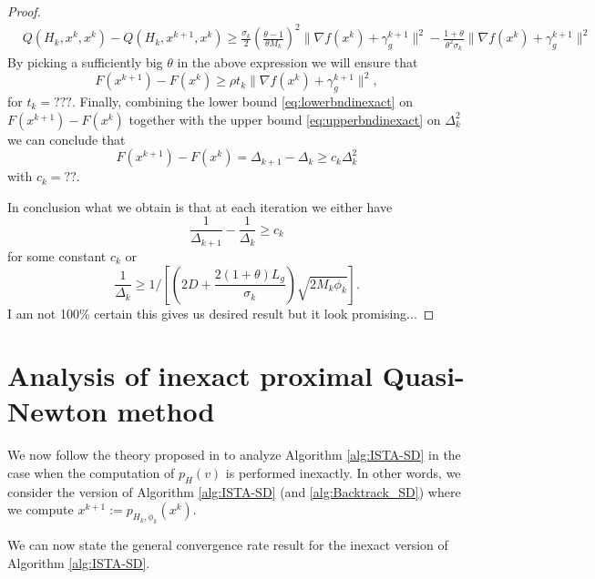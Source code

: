 \documentclass[11pt]{article}
\numberwithin{equation}{section}
\begin{document}
\begin{proof}
	       \begin{align}
	        &Q(H_k,x^k,x^k) - Q(H_k,x^{k+1}, x^k)\geq
	         \frac{\sigma_k}{2}(\frac{\theta-1}{\theta M_k})^2\| \nabla f(x^k) + \gamma_g^{k+1} \|^2- \frac{1+\theta}{\theta^2\sigma_k}\| \nabla f(x^k) + \gamma_g^{k+1} \|^2 \nonumber
	         \end{align}
	      By picking a sufficiently big $\theta$ in the above expression we will ensure that 
	 \[
	F(x^{k+1})-F(x^k)\geq \rho t_k \| \nabla f(x^k) + \gamma_g^{k+1} \|^2,
	\]   
	for $t_k=???$. 
	Finally, combining the lower bound \eqref{eq:lowerbndinexact} on $F(x^{k+1})-F(x^k)$ together with the upper bound \eqref {eq:upperbndinexact}
	on $\Delta_k^2$  we can conclude that
	\[
	F(x^{k+1})-F(x^k)=\Delta_{k+1}-\Delta_k\geq c_k\Delta_k^2
	\]
	with $c_k=??$. 

	In conclusion what we obtain is that at each iteration we either have 
	 \[
	\frac{1}{\Delta_{k+1}}-\frac{1}{\Delta_{k}}\geq c_k
	\]
	for some constant $c_k$ or
	 \[
	\frac{1}{\Delta_{k}}\geq  1/[(2D+  \frac{2(1+\theta)L_g}{\sigma_k})\sqrt{2M_k\phi_k}].
	\]
	I am not 100\% certain this gives us desired result but it look promising...	
\end{proof}

\section{Analysis of inexact proximal Quasi-Newton method} %
\label{sec:conv_inexact}

We now follow the theory proposed in  \cite{Schmidtetal} to analyze Algorithm \ref{alg:ISTA-SD}  in the case when the computation of $p_H( v)$ is performed inexactly. 
In other words, we consider the version of Algorithm \ref{alg:ISTA-SD} (and \ref{alg:Backtrack_SD}) where we compute 
$x^{k+1}  := p_{H_k, \phi_k}(x^k)$.



We can now state the general convergence rate result for the inexact version of Algorithm \ref{alg:ISTA-SD}.
\end{document}
